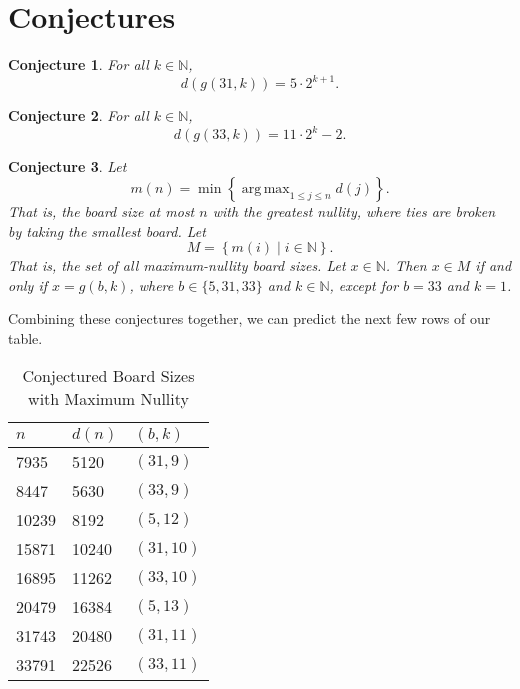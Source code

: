 \documentclass{article}
\newtheorem{conjecture}{Conjecture}
\newcommand{\N}{\mathbb{N}}
\DeclareMathOperator*{\argmax}{arg\,max}
\begin{document}
	\section{Conjectures}
	\begin{conjecture}
		For all $k \in \N$,
		\begin{equation*}
			d(g(31,k)) = 5\cdot2^{k+1}.
		\end{equation*}
	\end{conjecture}

	\begin{conjecture}
		For all $k \in \N$,
		\begin{equation*}
			d(g(33,k)) = 11\cdot2^{k} - 2.
		\end{equation*}
	\end{conjecture}

	\begin{conjecture}
		Let
		\begin{equation*}
			m(n) = \min\left\{\argmax_{1 \leq j \leq n} d(j)\right\}.
		\end{equation*}
		That is, the board size at most $n$ with the greatest nullity, where ties are broken by taking the smallest board.
		Let
		\begin{equation*}
			M = \left\{m(i) \mid i \in \N \right\}.
		\end{equation*}
		That is, the set of all maximum-nullity board sizes.
		Let $x \in \N$.
		Then $x \in M$ if and only if $x = g(b,k)$, where $b \in \{5,31,33\}$ and $k \in \N$, except for $b=33$ and $k=1$.
	\end{conjecture}

	Combining these conjectures together, we can predict the next few rows of our table.
	\begin{table}[H]
		\centering
		\begin{tabular}{|l|l|l|}
			\hline
			$n$ & $d(n)$ & $(b,k)$ \\
			\hline\hline
			7935 & 5120 & $(31,9)$ \\
			\hline
			8447 & 5630 & $(33,9)$ \\
			\hline
			10239 & 8192 & $(5,12)$ \\
			\hline
			15871 & 10240 & $(31,10)$ \\
			\hline
			16895 & 11262 & $(33,10)$ \\
			\hline
			20479 & 16384 & $(5,13)$ \\
			\hline
			31743 & 20480 & $(31,11)$ \\
			\hline
			33791 & 22526 & $(33,11)$ \\
			\hline
		\end{tabular}
		\caption{Conjectured Board Sizes with Maximum Nullity}
	\end{table}	
\end{document}
